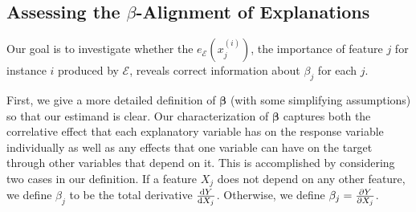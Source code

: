 \documentclass[mnsc,blindrev]{informs3}
\newcommand{\mE}{\mathcal{E}}
\begin{document}



\subsection{Assessing the $\beta$-Alignment of Explanations}
   \label{sec:evaluating_faithfulness}
     Our goal is to investigate whether the $e_\mE(x^{(i)}_j)$, the importance of feature $j$ for  instance $i$ produced by $\mE$, reveals correct information about $\beta_j$ for each $j$. %
     
     First, we give a more detailed definition of $\boldsymbol{\beta}$ (with some simplifying assumptions) so that our estimand is clear. Our characterization of $\boldsymbol{\beta}$ captures both the correlative effect that each explanatory variable has on the response variable individually as well as any effects that one variable can have on the target through other variables that depend on it. This is accomplished by considering two cases in our definition. If a feature $X_j$ does not depend on any other feature, we define $\beta_j$ to be the total derivative $\dv{Y}{X_j}$. Otherwise, we define $\beta_j = \pdv{Y}{X_j}$. 
\end{document}
